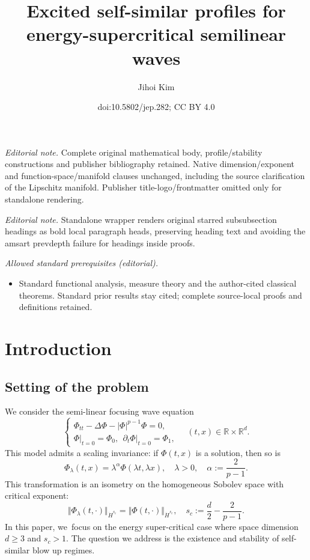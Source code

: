\documentclass[10pt]{amsart}
\title{Excited self-similar profiles for energy-supercritical semilinear waves}
\author{Jihoi Kim}
\date{doi:10.5802/jep.282; CC BY 4.0}
\theoremstyle{plain}
\theoremstyle{definition}
\begin{document}
\maketitle
\noindent\textit{Editorial note.} Complete original mathematical body, profile/stability constructions and publisher bibliography retained. Native dimension/exponent and function-space/manifold clauses unchanged, including the source clarification of the Lipschitz manifold. Publisher title-logo/frontmatter omitted only for standalone rendering.\par\medskip
\noindent\textit{Editorial note.} Standalone wrapper renders original starred subsubsection headings as bold local paragraph heads, preserving heading text and avoiding the amsart prevdepth failure for headings inside proofs.\par\medskip
\noindent\textit{Allowed standard prerequisites (editorial).}\begin{itemize}
\item Standard functional analysis, measure theory and the author-cited classical theorems. Standard prior results stay cited; complete source-local proofs and definitions retained.
\end{itemize}\medskip
\vspace*{-\baselineskip}
\tableofcontents


\section{Introduction}

\subsection{Setting of the problem} We consider the semi-linear focusing wave equation
\begin{equation}
\label{eq: Nonlinear Wave}
\begin{cases}\Phi_{tt}-\Delta\Phi-|\Phi|^{p-1}\Phi=0,\\
\Phi\big|_{t=0}=\Phi_0,\ \ \partial_t\Phi\big|_{t=0}=\Phi_1,\end{cases}
\quad (t,x) \in \mathbb R\times \mathbb R^d.
\end{equation}
This model admits a scaling invariance: if $\Phi(t,x)$ is a solution, then so is
\[
\Phi_\lambda(t,x)=\lambda^\alpha \Phi(\lambda t,\lambda x),\quad \lambda>0,\quad \alpha:=\frac{2}{p-1}.
\]
This transformation is an isometry on the homogeneous Sobolev space with critical exponent:
\begin{equation}
\label{eq: Critical Scaling}
\Vert \Phi_\lambda(t,\cdot)\Vert_{\dot H^{s_c}}=\Vert \Phi(t,\cdot)\Vert_{\dot H^{s_c}},\quad s_c:=\frac{d}{2}-\frac{2}{p-1}.
\end{equation}
In this paper, we~focus on the energy super-critical case where space dimension $d\ge 3$ and $s_c>1$. The question we address is the existence and stability of self-similar blow up regimes.
\end{document}
